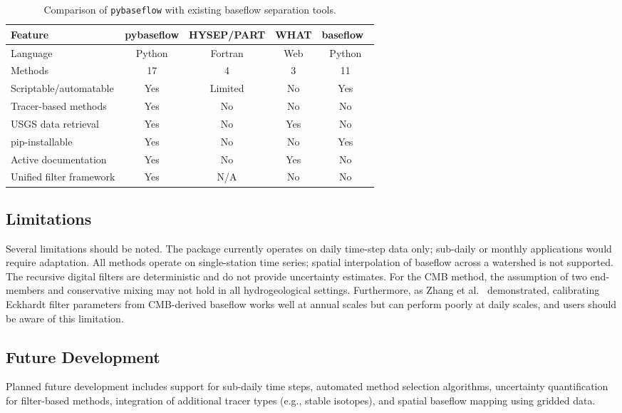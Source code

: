\documentclass[hydrology,article,submit,pdftex,moreauthors]{Definitions/mdpi}
\begin{document}
\begin{table}[H]
\caption{Comparison of \texttt{pybaseflow} with existing baseflow separation tools.\label{tab:comparison}}
\small
\begin{tabularx}{\textwidth}{lcccc}
\toprule
\textbf{Feature} & \textbf{pybaseflow} & \textbf{HYSEP/PART} & \textbf{WHAT} & \textbf{baseflow}~\cite{Xie2020} \\
\midrule
Language & Python & Fortran & Web & Python \\
Methods & 17 & 4 & 3 & 11 \\
Scriptable/automatable & Yes & Limited & No & Yes \\
Tracer-based methods & Yes & No & No & No \\
USGS data retrieval & Yes & No & Yes & No \\
pip-installable & Yes & No & No & Yes \\
Active documentation & Yes & No & Yes & No \\
Unified filter framework & Yes & N/A & No & No \\
\bottomrule
\end{tabularx}
\end{table}

\subsection{Limitations}
\label{sec:limitations}

Several limitations should be noted. The package currently operates on daily time-step data only; sub-daily or monthly applications would require adaptation. All methods operate on single-station time series; spatial interpolation of baseflow across a watershed is not supported. The recursive digital filters are deterministic and do not provide uncertainty estimates. For the CMB method, the assumption of two end-members and conservative mixing may not hold in all hydrogeological settings. Furthermore, as Zhang et al.~\cite{Zhang2021} demonstrated, calibrating Eckhardt filter parameters from CMB-derived baseflow works well at annual scales but can perform poorly at daily scales, and users should be aware of this limitation.

\subsection{Future Development}
\label{sec:future}

Planned future development includes support for sub-daily time steps, automated method selection algorithms, uncertainty quantification for filter-based methods, integration of additional tracer types (e.g., stable isotopes), and spatial baseflow mapping using gridded data.
\end{document}
